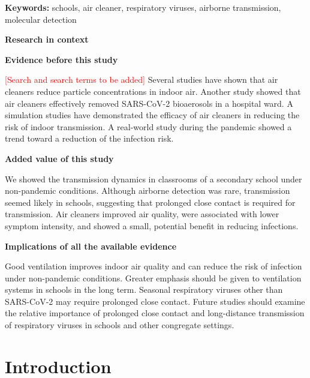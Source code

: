 \documentclass[fleqn,11pt]{wlscirep}
\begin{document}
\vspace{0.5em}

\noindent\textbf{Keywords:} schools, air cleaner, respiratory viruses, airborne transmission, molecular detection

\thispagestyle{empty}
\sloppy
\raggedbottom

\newpage

\noindent\textbf{\Large{Research in context}} \medskip

\noindent \textbf{Evidence before this study} \smallskip

\noindent \textcolor{red}{[Search and search terms to be added]} Several studies have shown that air cleaners reduce particle concentrations in indoor air. Another study showed that air cleaners effectively removed SARS-CoV-2 bioaerosols in a hospital ward. A simulation studies have demonstrated the efficacy of air cleaners in reducing the risk of indoor transmission. A real-world study during the pandemic showed a trend toward a reduction of the infection risk. \medskip

\noindent \textbf{Added value of this study} \smallskip

\noindent We showed the transmission dynamics in classrooms of a secondary school under non-pandemic conditions. Although airborne detection was rare, transmission seemed likely in schools, suggesting that prolonged close contact is required for transmission. Air cleaners improved air quality, were associated with lower symptom intensity, and showed a small, potential benefit in reducing infections.\medskip

\noindent \textbf{Implications of all the available evidence} \smallskip

\noindent Good ventilation improves indoor air quality and can reduce the risk of infection under non-pandemic conditions. Greater emphasis should be given to ventilation systems in schools in the long term. Seasonal respiratory viruses other than SARS-CoV-2 may require prolonged close contact. Future studies should examine the relative importance of prolonged close contact and long-distance transmission of respiratory viruses in schools and other congregate settings.

\thispagestyle{empty}
\sloppy
\raggedbottom

\newpage

\setcounter{page}{1}

\section{Introduction} 
\end{document}

